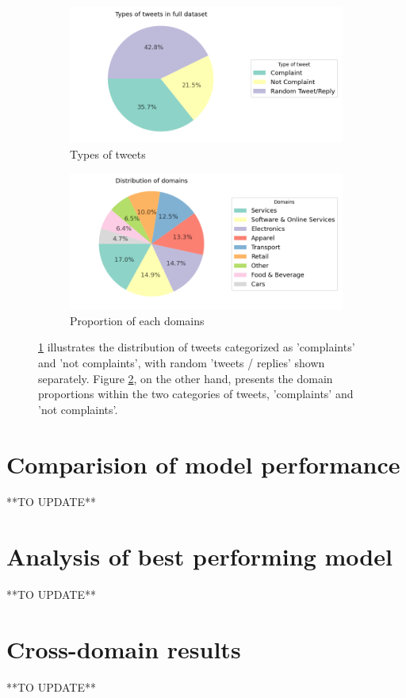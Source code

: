 \begin{figure}[htbp]
    \centering
    \captionsetup{font=small}
    \begin{subfigure}{0.49\textwidth}
        \centering
        \includegraphics[width=\linewidth]{figures/compl_non_random_dist.png}
        \caption{Types of tweets}
        \label{fig: compl_non_random_dist}
    \end{subfigure}
    \hfill
    \begin{subfigure}{0.49\textwidth}
        \centering
        \includegraphics[width=\linewidth]{figures/domain_dist.png}
        \caption{Proportion of each domains}
        \label{fig: domain_dist}
    \end{subfigure}
    \caption{ \ref{fig: compl_non_random_dist} illustrates the distribution of tweets categorized as 'complaints' and 'not complaints', with random 'tweets / replies' shown separately. Figure \ref{fig: domain_dist}, on the other hand, presents the domain proportions within the two categories of tweets, 'complaints' and 'not complaints'.}
    \label{fig: compl_main_dist}
\end{figure}

\section{Comparision of model performance}
**TO UPDATE**

\section{Analysis of best performing model}
**TO UPDATE**

\section{Cross-domain results}
**TO UPDATE**